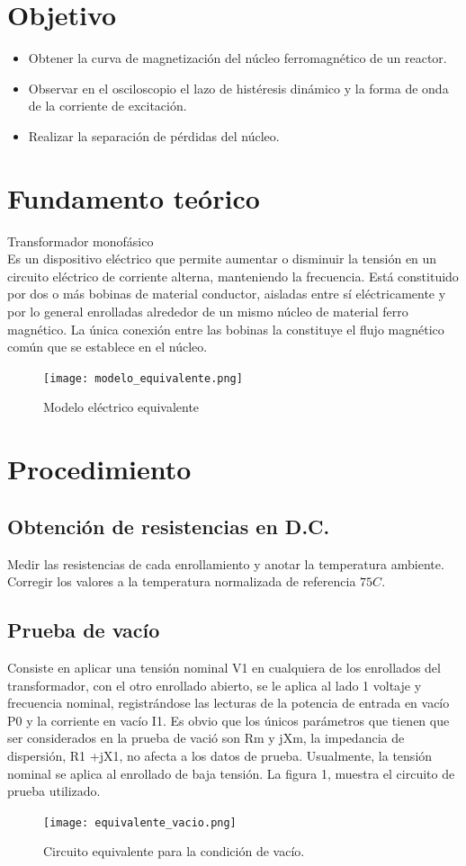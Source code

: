 \section{Objetivo}
\begin{itemize}
    \item Obtener la curva de magnetización del núcleo ferromagnético de un reactor.
    \item Observar en el osciloscopio el lazo de histéresis dinámico y la forma de onda de la corriente de excitación.
    \item Realizar la separación de pérdidas del núcleo.
\end{itemize}

\section{Fundamento teórico}
Transformador monofásico\\
Es un dispositivo eléctrico que permite aumentar o disminuir la tensión en un circuito eléctrico de corriente alterna, manteniendo la frecuencia. Está constituido por dos o más bobinas de material conductor, aisladas entre sí eléctricamente y por lo general enrolladas alrededor de un mismo núcleo de material ferro magnético. La única conexión entre las bobinas la constituye el flujo magnético común que se establece en el núcleo.
\begin{figure}[H]
    \centering
    \texttt{[image: modelo\_equivalente.png]}
    \captionsetup{labelformat=empty}
    \caption{Modelo eléctrico equivalente}
\end{figure}

\section{Procedimiento}

\subsection{Obtención de resistencias en D.C.}
Medir las resistencias de cada enrollamiento y anotar la temperatura ambiente. Corregir los valores a la temperatura normalizada de referencia $75C$.

\subsection{Prueba de vacío}
Consiste en aplicar una tensión nominal V1 en cualquiera de los enrollados del transformador, con el otro enrollado abierto, se le aplica al lado 1 voltaje y frecuencia nominal, registrándose las lecturas de la potencia de entrada en vacío P0 y la corriente en vacío I1. Es obvio que los únicos parámetros que tienen que ser considerados en la prueba de vació son Rm y jXm, la impedancia de dispersión, R1 +jX1, no afecta a los datos de prueba. Usualmente, la tensión nominal se aplica al enrollado de baja tensión. La figura 1, muestra el circuito de prueba utilizado.
\begin{figure}[H]
    \centering
    \texttt{[image: equivalente\_vacio.png]}
    \captionsetup{labelformat=empty}
    \caption{Circuito equivalente para la condición de vacío.}
\end{figure}

